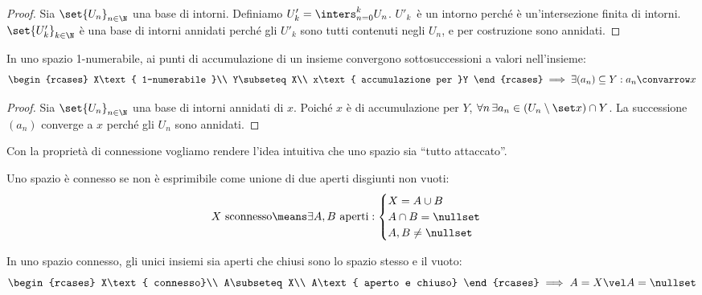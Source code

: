 \begin{proof}
	Sia $\set{U_n}_{n\in\N}$ una base di intorni.
	Definiamo $U'_k=\inters_{n=0}^kU_n$.
	$U'_k$~è un intorno perché è un'intersezione finita di intorni.
	$\set{U'_k}_{k\in\N}$ è una base di intorni annidati perché gli $U'_k$ sono tutti contenuti negli $U_n$, e per costruzione sono annidati.
\end{proof}

\begin{prop}
	\label{th:1numaccsucc}
	In uno spazio 1-numerabile, ai punti di accumulazione di un insieme convergono sottosuccessioni a valori nell'insieme:
	\[\begin{rcases}
		X\text{ 1-numerabile }\\
		Y\subseteq X\\
		x\text{ accumulazione per }Y
	\end{rcases}\implies
	\exists(a_n)\subseteq Y:a_n\convarrow x\]
\end{prop}

\begin{proof}
	Sia $\set{U_n}_{n\in\N}$ una base di intorni annidati di $x$.
	Poiché $x$ è di accumulazione per $Y$,
	$\forall n\,\exists a_n\in(U_n\setminus\set x)\cap Y$.
	La successione $(a_n)$ converge a $x$ perché gli $U_n$ sono annidati.
\end{proof}


Con la proprietà di connessione vogliamo rendere l'idea intuitiva che uno spazio sia ``tutto attaccato''.

\begin{defn}[Connessione]
	Uno spazio è connesso se non è esprimibile come unione di due aperti disgiunti non vuoti:
	\[X\text{ sconnesso}\means
	\exists A,B\text{ aperti}:
	\begin{cases}
		X=A\cup B\\
		A\cap B=\nullset\\
		A,B\neq\nullset
	\end{cases}\]
\end{defn}

\begin{prop}
	\label{th:connapchius}
	In uno spazio connesso, gli unici insiemi sia aperti che chiusi sono lo spazio stesso e il vuoto:
	\[\begin{rcases}
		X\text{ connesso}\\
		A\subseteq X\\
		A\text{ aperto e chiuso}
	\end{rcases}\implies A=X\vel A=\nullset\]
\end{prop}

